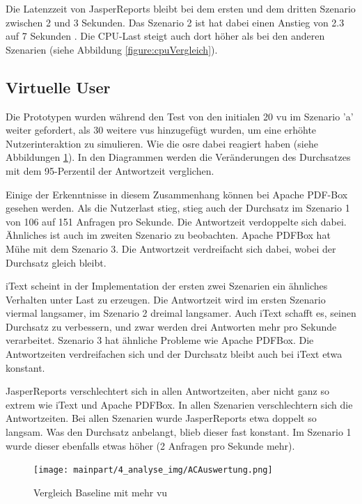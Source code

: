 \documentclass[main.tex]{subfiles}
\begin{document}
Die Latenzzeit von JasperReports bleibt bei dem ersten und dem dritten Szenario zwischen 2 und 3 Sekunden. Das Szenario 2 ist hat dabei einen Anstieg von 2.3 auf 7 Sekunden . Die CPU-Last steigt auch dort höher als bei den anderen Szenarien (siehe Abbildung \ref{figure:cpuVergleich}). 


\subsection{Virtuelle User}
Die Prototypen wurden während den Test von den initialen 20 \acrshort{vu} im Szenario 'a' weiter gefordert, als 30 weitere \acrshort{vu}s hinzugefügt wurden, um eine erhöhte Nutzerinteraktion zu simulieren. Wie die \acrshort{osre} dabei reagiert haben (siehe Abbildungen  \ref{figure:vglACVU}). In den Diagrammen werden die Veränderungen des Durchsatzes mit dem  95-Perzentil der Antwortzeit verglichen.


Einige der Erkenntnisse in diesem Zusammenhang können bei Apache PDF-Box gesehen werden. Als die Nutzerlast stieg, stieg auch der Durchsatz im Szenario 1 von 106 auf 151 Anfragen pro Sekunde. Die Antwortzeit verdoppelte sich dabei. Ähnliches ist auch im zweiten Szenario zu beobachten. Apache PDFBox hat Mühe mit dem Szenario 3. Die Antwortzeit verdreifacht sich dabei, wobei der Durchsatz gleich bleibt.

iText scheint in der Implementation der ersten zwei Szenarien ein ähnliches Verhalten unter Last zu erzeugen. Die Antwortzeit wird im ersten Szenario viermal langsamer, im Szenario 2 dreimal langsamer. Auch iText schafft es, seinen Durchsatz zu verbessern, und zwar werden drei Antworten mehr pro Sekunde verarbeitet. Szenario 3 hat ähnliche Probleme wie Apache PDFBox. Die Antwortzeiten verdreifachen sich und der Durchsatz bleibt auch bei iText etwa konstant.

JasperReports verschlechtert sich in allen Antwortzeiten, aber nicht ganz so extrem wie iText und Apache PDFBox. In allen Szenarien verschlechtern sich die Antwortzeiten. Bei allen Szenarien wurde JasperReports etwa doppelt so langsam. Was den Durchsatz anbelangt, blieb dieser fast konstant. Im Szenario 1 wurde dieser ebenfalls etwas höher (2 Anfragen pro Sekunde mehr).


\begin{figure}[H]
\centering
\texttt{[image: mainpart/4\_analyse\_img/ACAuswertung.png]}
 \caption{Vergleich Baseline mit mehr \acrshort{vu}}
 \label{figure:vglACVU}
\end{figure}
\end{document}
